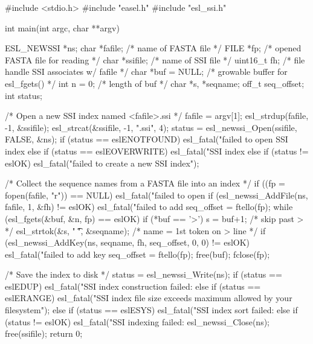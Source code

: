 \begin{cchunk}
#include <stdio.h>
#include "easel.h"
#include "esl_ssi.h"

int 
main(int argc, char **argv)
{
  ESL_NEWSSI *ns;
  char    *fafile;              /* name of FASTA file                   */
  FILE    *fp;                  /* opened FASTA file for reading        */
  char    *ssifile;             /* name of SSI file                     */
  uint16_t fh;                  /* file handle SSI associates w/ fafile */
  char    *buf = NULL;          /* growable buffer for esl_fgets()      */
  int      n   = 0;             /* length of buf                        */
  char    *s, *seqname;		
  off_t    seq_offset;
  int      status;

  /* Open a new SSI index named <fafile>.ssi */
  fafile = argv[1];
  esl_strdup(fafile,   -1, &ssifile);  
  esl_strcat(&ssifile, -1, ".ssi", 4); 
  status = esl_newssi_Open(ssifile, FALSE, &ns);
  if      (status == eslENOTFOUND)   esl_fatal("failed to open SSI index %
  else if (status == eslEOVERWRITE)  esl_fatal("SSI index %
  else if (status != eslOK)          esl_fatal("failed to create a new SSI index");

  /* Collect the sequence names from a FASTA file into an index */
  if ((fp = fopen(fafile, "r"))              == NULL)  esl_fatal("failed to open %
  if (esl_newssi_AddFile(ns, fafile, 1, &fh) != eslOK) esl_fatal("failed to add %
  seq_offset = ftello(fp);
  while (esl_fgets(&buf, &n, fp) == eslOK)
    {
      if (*buf == '>') {
	s = buf+1;                           /* skip past >                */
	esl_strtok(&s, " \t\n", &seqname);   /* name = 1st token on > line */
	if (esl_newssi_AddKey(ns, seqname, fh, seq_offset, 0, 0) != eslOK)
	  esl_fatal("failed to add key %
      }
      seq_offset = ftello(fp);				 
    }
  free(buf);
  fclose(fp);

  /* Save the index to disk */
  status = esl_newssi_Write(ns);
  if      (status == eslEDUP)     esl_fatal("SSI index construction failed:\n  %
  else if (status == eslERANGE)   esl_fatal("SSI index file size exceeds maximum allowed by your filesystem");
  else if (status == eslESYS)     esl_fatal("SSI index sort failed:\n  %
  else if (status != eslOK)       esl_fatal("SSI indexing failed:\n  %
  esl_newssi_Close(ns);  
  free(ssifile);
  return 0;
}
\end{cchunk}
